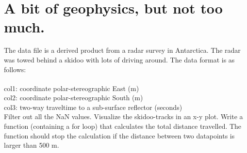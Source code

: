 \section{A bit of geophysics, but not too much.}
The data file is a derived product from a radar survey in Antarctica. The radar was towed behind a skidoo with lots of driving around. The data format is as follows:\\
\\
col1: coordinate polar-stereographic East (m) \\
col2: coordinate polar-stereographic South (m) \\ 
col3: two-way traveltime to a sub-surface reflector (seconds) \\

Filter out all the NaN values. Visualize the skidoo-tracks in an x-y plot. Write a function (containing a for loop) that calculates the total distance travelled. The function should stop the calculation if the distance between two datapoints is larger than 500 m.
